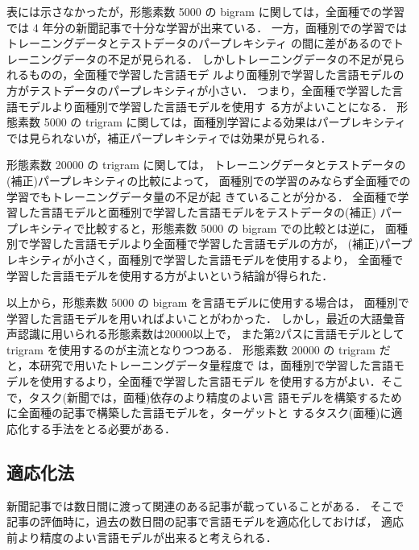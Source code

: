 表には示さなかったが，形態素数 5000 の bigram に関しては，全面種での学習
では 4 年分の新聞記事で十分な学習が出来ている．
一方，面種別での学習ではトレーニングデータとテストデータのパープレキシティ
の間に差があるのでトレーニングデータの不足が見られる．
しかしトレーニングデータの不足が見られるものの，全面種で学習した言語モデ
ルより面種別で学習した言語モデルの方がテストデータのパープレキシティが小さい．
つまり，全面種で学習した言語モデルより面種別で学習した言語モデルを使用す
る方がよいことになる．
形態素数 5000 の trigram に関しては，面種別学習による効果はパープレキシティ
では見られないが，補正パープレキシティでは効果が見られる．

形態素数 20000 の trigram に関しては，
トレーニングデータとテストデータの(補正)パープレキシティの比較によって，
面種別での学習のみならず全面種での学習でもトレーニングデータ量の不足が起
きていることが分かる．
全面種で学習した言語モデルと面種別で学習した言語モデルをテストデータの(補正)
パープレキシティで比較すると，形態素数 5000 の bigram での比較とは逆に，
面種別で学習した言語モデルより全面種で学習した言語モデルの方が，
(補正)パープレキシティが小さく，面種別で学習した言語モデルを使用するより，
全面種で学習した言語モデルを使用する方がよいという結論が得られた．

以上から，形態素数 5000 の bigram を言語モデルに使用する場合は，
面種別で学習した言語モデルを用いればよいことがわかった．
しかし，最近の大語彙音声認識に用いられる形態素数は20000以上で，
また第2パスに言語モデルとして trigram を使用するのが主流となりつつある．
形態素数 20000 の trigram だと，本研究で用いたトレーニングデータ量程度で
は，面種別で学習した言語モデルを使用するより，全面種で学習した言語モデル
を使用する方がよい．そこで，タスク(新聞では，面種)依存のより精度のよい言
語モデルを構築するために全面種の記事で構築した言語モデルを，ターゲットと
するタスク(面種)に適応化する手法をとる必要がある．

\vspace*{-4mm}
{\small

\vspace*{-5mm}
}

\newpage

{\small

\vspace{-6mm}

}

\newpage

\subsection{適応化法}
 新聞記事では数日間に渡って関連のある記事が載っていることがある．
 そこで記事の評価時に，過去の数日間の記事で言語モデルを適応化しておけば，
 適応前より精度のよい言語モデルが出来ると考えられる．
 
